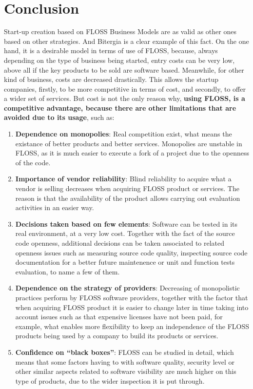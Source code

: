 \documentclass[11pt]{article}
\begin{document}
\section{Conclusion}
Start-up creation based on FLOSS Business Models are as valid as other ones based on other strategies. And Bitergia is a clear example of this fact. On the one hand, it is a desirable model in terms of use of FLOSS, because, always depending on the type of business being started, entry costs can be very low, above all if the key products to be sold are software based. Meanwhile, for other kind of business, costs are decreased drastically. This allows the startup companies, firstly, to be more competitive in terms of cost, and secondly, to offer a wider set of services. But cost is not the only reason why, \textbf{using FLOSS, is a competitive advantage, because there are other limitations that are avoided due to its usage}, such as:
\begin{enumerate}
\item{\textbf{Dependence on monopolies}}: Real competition exist, what means the existance of better products and better services. Monopolies are unstable in FLOSS, as it is much easier to execute a fork of a project due to the openness of the code.
\item{\textbf{Importance of vendor reliability}}:
Blind reliability to acquire what a vendor is selling decreases when acquiring FLOSS product or services. The reason is that the availability of the product allows carrying out evaluation activities in an easier way.
\item{\textbf{Decisions taken based on few elements}}:
Software can be tested in its real environment, at a very low cost. Together with the fact of the source code openness, additional decisions can be taken associated to related openness issues such as measuring source code quality, inspecting source code documentation for a better future maintenence or unit and function tests evaluation, to name a few of them.
\item{\textbf{Dependence on the strategy of providers}}:
Decreasing of monopolistic practices perform by FLOSS software providers, together with the factor that when acquiring FLOSS product it is easier to change later in time taking into account issues such as that expensive licenses have not been paid, for example, what enables more flexibility to keep an independence of the FLOSS products being used by a company to build its products or services.
\item{\textbf{Confidence on “black boxes”}}: FLOSS can be studied in detail, which means that some factors having to with software quality, security level or other similar aspects related to software visibility are much higher on this type of products, due to the wider inspection it is put through.
\end{enumerate}
\end{document}
